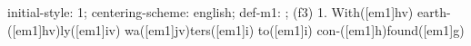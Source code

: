initial-style: 1;
centering-scheme: english;
def-m1: \grealign;
(f3) 1. With([em1]hv) earth-([em1]hv)ly([em1]iv) wa([em1]jv)ters([em1]i) to([em1]i) con-([em1]h)found([em1]g)